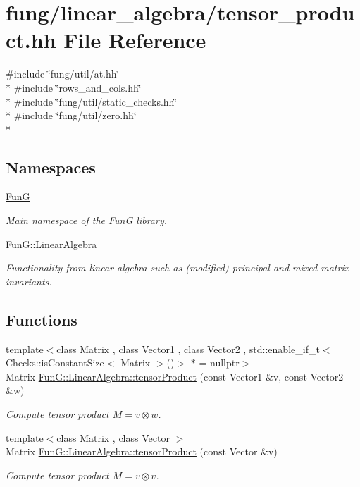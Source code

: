 \hypertarget{tensor__product_8hh}{}\section{fung/linear\+\_\+algebra/tensor\+\_\+product.hh File Reference}
\label{tensor__product_8hh}
{\ttfamily \#include \char`\"{}fung/util/at.\+hh\char`\"{}}\\*
{\ttfamily \#include \char`\"{}rows\+\_\+and\+\_\+cols.\+hh\char`\"{}}\\*
{\ttfamily \#include \char`\"{}fung/util/static\+\_\+checks.\+hh\char`\"{}}\\*
{\ttfamily \#include \char`\"{}fung/util/zero.\+hh\char`\"{}}\\*
\subsection*{Namespaces}
\begin{DoxyCompactItemize}
\item 
 \hyperlink{namespaceFunG}{Fun\+G}
\begin{DoxyCompactList}\small\item\em Main namespace of the Fun\+G library. \end{DoxyCompactList}\item 
 \hyperlink{namespaceFunG_1_1LinearAlgebra}{Fun\+G\+::\+Linear\+Algebra}
\begin{DoxyCompactList}\small\item\em Functionality from linear algebra such as (modified) principal and mixed matrix invariants. \end{DoxyCompactList}\end{DoxyCompactItemize}
\subsection*{Functions}
\begin{DoxyCompactItemize}
\item 
{\footnotesize template$<$class Matrix , class Vector1 , class Vector2 , std\+::enable\+\_\+if\+\_\+t$<$ Checks\+::is\+Constant\+Size$<$ Matrix $>$()$>$ $\ast$  = nullptr$>$ }\\Matrix \hyperlink{group__LinearAlgebraGroup_ga5d0e066e6184fb3324d96d20087b5578}{Fun\+G\+::\+Linear\+Algebra\+::tensor\+Product} (const Vector1 \&v, const Vector2 \&w)
\begin{DoxyCompactList}\small\item\em Compute tensor product $ M = v \otimes w $. \end{DoxyCompactList}\item 
{\footnotesize template$<$class Matrix , class Vector $>$ }\\Matrix \hyperlink{group__LinearAlgebraGroup_gae5e82b9e66319511dae5ff0d9304a6b7}{Fun\+G\+::\+Linear\+Algebra\+::tensor\+Product} (const Vector \&v)
\begin{DoxyCompactList}\small\item\em Compute tensor product $ M = v \otimes v $. \end{DoxyCompactList}\end{DoxyCompactItemize}
